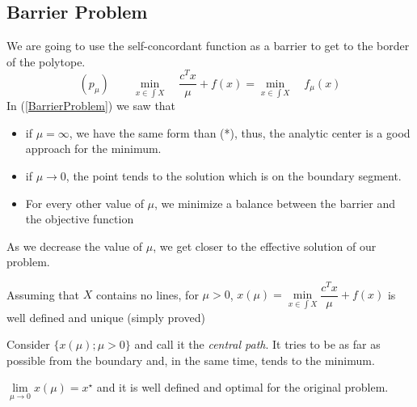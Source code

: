 \subsection{Barrier Problem} 
We are going to use the self-concordant function as a barrier to get to the border of the polytope.
\begin{equation}
\label{BarrierProblem}
(p_{\mu}) \qquad \underset{x \in \int X}{\min} \quad \dfrac{c^T x}{\mu} + f(x) = \underset{x \in \int X}{\min} \quad f_{\mu}(x)
\end{equation}
In (\ref{BarrierProblem}) we saw that
\begin{itemize}
\item if $\mu = \infty$, we have the same form than (*), thus, the analytic center is a good approach for the minimum.
\item if $\mu \rightarrow 0$, the point tends to the solution which is on the boundary segment.
\item For every other value of $\mu$, we minimize a balance between the barrier and the objective function
\end{itemize}
As we decrease the value of $\mu$, we get closer to the effective solution of our problem.
\newline
\begin{theorem}
Assuming that $X$ contains no lines, for $\mu > 0$, $x(\mu) = \underset{x \in \int X}{\min} \dfrac{c^T x}{\mu} + f(x)$ is well defined and unique (simply proved)
\end{theorem}
Consider $\lbrace x(\mu) ; \mu > 0 \rbrace$ and call it the \textit{central path}. It tries to be as far as possible from the boundary  and, in the same time, tends to the minimum.\\

\begin{property}
$\underset{\mu \rightarrow 0}{\lim} x(\mu) = x^{\star}$ and it is well defined and optimal for the original problem.
\end{property} 

